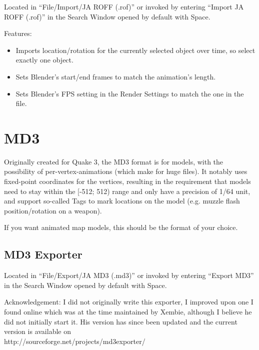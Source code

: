 \documentclass[a4paper,10pt]{article}
\begin{document}
 Located in ``File/Import/JA ROFF (.rof)'' or invoked by entering ``Import JA ROFF (.rof)'' in the Search Window
 opened by default with Space.
 
 Features:
 \begin{itemize}
  \item Imports location/rotation for the currently selected object over time, so select exactly one object.
  \item Sets Blender's start/end frames to match the animation's length.
  \item Sets Blender's FPS setting in the Render Settings to match the one in the file.
 \end{itemize}
 
 \section{MD3}
 
 Originally created for Quake 3, the MD3 format is for models, with the possibility of per-vertex-animations
 (which make for huge files). It notably uses fixed-point coordinates for the vertices, resulting in the
 requirement that models need to stay within the [-512; 512) range and only have a precision of 1/64 unit,
 and support so-called Tags to mark locations on the model (e.g. muzzle flash position/rotation on a weapon).
 
 If you want animated map models, this should be the format of your choice.
 
 \subsection{MD3 Exporter}
 
 Located in ``File/Export/JA MD3 (.md3)'' or invoked by entering ``Export MD3'' in the Search Window
 opened by default with Space.
 
 Acknowledgement: I did not originally write this exporter, I improved upon one I found online which was at
 the time maintained by Xembie, although I believe he did not initially start it. His version has since been
 updated and the current version is available on\\
 http://sourceforge.net/projects/md3exporter/
 
\end{document}
